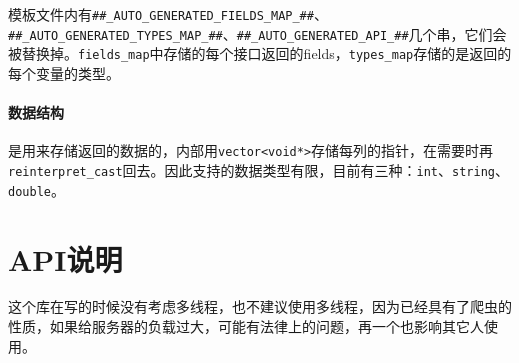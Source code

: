 \documentclass[a4paper, 11pt,UTF8,oneside]{article}
\newcommand{\cd}[1]{\texttt{#1}}
\begin{document}
模板文件内有\cd{\#\#\_AUTO\_GENERATED\_FIELDS\_MAP\_\#\#}、\cd{\#\#\_AUTO\_GENERATED\_TYPES\_MAP\_\#\#}、\cd{\#\#\_AUTO\_GENERATED\_API\_\#\#}几个串，它们会被替换掉。\cd{fields\_map}中存储的每个接口返回的fields，\cd{types\_map}存储的是返回的每个变量的类型。

\paragraph{数据结构}是用来存储返回的数据的，内部用\cd{vector<void*>}存储每列的指针，在需要时再\cd{reinterpret\_cast}回去。因此支持的数据类型有限，目前有三种：\cd{int}、\cd{string}、\cd{double}。

\section{API说明}
这个库在写的时候没有考虑多线程，也不建议使用多线程，因为已经具有了爬虫的性质，如果给服务器的负载过大，可能有法律上的问题，再一个也影响其它人使用。
\end{document}
